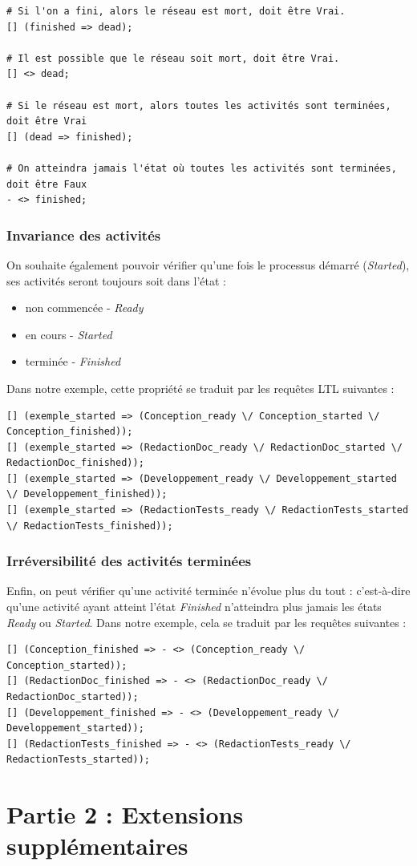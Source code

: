 \documentclass{report}
\begin{document}
\begin{verbatim}
# Si l'on a fini, alors le réseau est mort, doit être Vrai.
[] (finished => dead);

# Il est possible que le réseau soit mort, doit être Vrai.
[] <> dead;

# Si le réseau est mort, alors toutes les activités sont terminées, doit être Vrai
[] (dead => finished);

# On atteindra jamais l'état où toutes les activités sont terminées, doit être Faux
- <> finished;
\end{verbatim}

\subsection{Invariance des activités}

On souhaite également pouvoir vérifier qu'une fois le processus démarré (\textit{Started}), ses activités seront toujours soit dans l'état :
\begin{itemize}
\item non commencée - \textit{Ready}
\item en cours - \textit{Started}
\item terminée - \textit{Finished}
\end{itemize}
Dans notre exemple, cette propriété se traduit par les requêtes LTL suivantes :

\begin{verbatim}
[] (exemple_started => (Conception_ready \/ Conception_started \/ Conception_finished));
[] (exemple_started => (RedactionDoc_ready \/ RedactionDoc_started \/ RedactionDoc_finished));
[] (exemple_started => (Developpement_ready \/ Developpement_started \/ Developpement_finished));
[] (exemple_started => (RedactionTests_ready \/ RedactionTests_started \/ RedactionTests_finished));
\end{verbatim}

\subsection{Irréversibilité des activités terminées}

Enfin, on peut vérifier qu'une activité terminée n'évolue plus du tout : c'est-à-dire qu'une activité ayant atteint l'état \textit{Finished} n'atteindra plus jamais les états \textit{Ready} ou \textit{Started}. Dans notre exemple, cela se traduit par les requêtes suivantes :

\begin{verbatim}
[] (Conception_finished => - <> (Conception_ready \/ Conception_started));
[] (RedactionDoc_finished => - <> (RedactionDoc_ready \/ RedactionDoc_started));
[] (Developpement_finished => - <> (Developpement_ready \/ Developpement_started));
[] (RedactionTests_finished => - <> (RedactionTests_ready \/ RedactionTests_started));
\end{verbatim}

\chapter{Partie 2 : Extensions supplémentaires}


\end{document}

